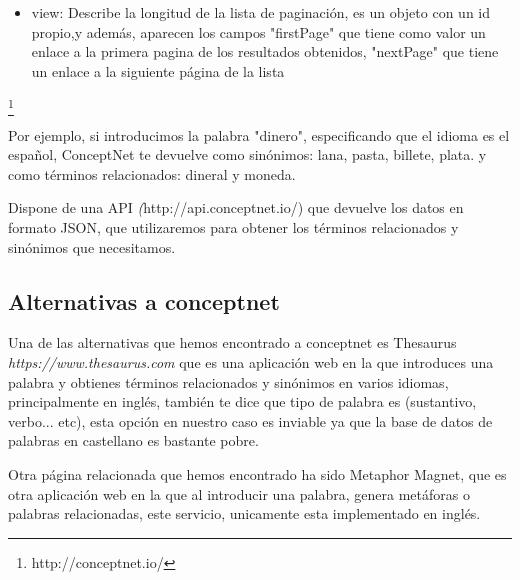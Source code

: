 \begin{itemize}
\begin{itemize}
		\item surfaceText: Indica de que frase del lenguaje natural se han extraido los datos que estan guardados en conceptnet
		\item weight: Indica la fiabilidad de la información guardada en conceptnet, siendo normal que su valor sea 1.0. Dicho valor es mayor cuanto más filedigna sean los datos.
	\end{itemize}
	\item view: Describe la longitud de la lista de paginación, es un objeto con un id propio,y además, aparecen los campos "firstPage" que tiene como valor un enlace a la primera pagina de los resultados obtenidos, "nextPage" que tiene un enlace a la siguiente página de la lista
\end{itemize}


\footnote{http://conceptnet.io/}

Por ejemplo, si introducimos la palabra "dinero", especificando que el idioma es el español, ConceptNet te devuelve como sinónimos: lana, pasta, billete, plata. y como términos relacionados: dineral y moneda.

Dispone de una API \textit({http://api.conceptnet.io/}) que devuelve los datos en formato JSON, que utilizaremos para obtener los términos relacionados y sinónimos que necesitamos.
\subsection{Alternativas a conceptnet}
Una de las alternativas que hemos encontrado a conceptnet es Thesaurus \textit{https://www.thesaurus.com } que es una aplicación web en la que introduces una palabra y obtienes términos relacionados y sinónimos en varios idiomas, principalmente en inglés, también te dice que tipo de palabra es (sustantivo, verbo... etc), esta opción en nuestro caso es inviable ya que la base de datos de palabras en castellano es bastante pobre.

Otra página relacionada que hemos encontrado ha sido Metaphor Magnet, que es otra aplicación web en la que al introducir una palabra, genera metáforas o palabras relacionadas, este servicio, unicamente esta implementado en inglés.

